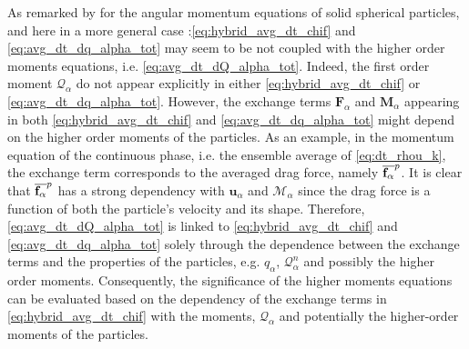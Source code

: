 As remarked by \citet{jackson1997locally} for the angular momentum equations of solid spherical particles, and here in a more general case :\ref{eq:hybrid_avg_dt_chif} and \ref{eq:avg_dt_dq_alpha_tot} may seem to be not coupled with the higher order moments equations, i.e. \ref{eq:avg_dt_dQ_alpha_tot}. 
Indeed, the first order moment $\mathcal{Q}_\alpha$ do not appear explicitly in either \ref{eq:hybrid_avg_dt_chif} or \ref{eq:avg_dt_dq_alpha_tot}.
However, the exchange terms 
$\textbf{F}_\alpha$ 
and 
$\textbf{M}_\alpha$ 
appearing in both \ref{eq:hybrid_avg_dt_chif} and \ref{eq:avg_dt_dq_alpha_tot} might depend on the higher order moments of the particles.
As an example, in the momentum equation of the continuous phase, i.e. the ensemble average of \ref{eq:dt_rhou_k}, the exchange term corresponds to the averaged drag force, namely $\overline{\textbf{f}_\alpha}^{p}$. 
It is clear that $\overline{\textbf{f}_\alpha}^{p}$ has a strong dependency with $\textbf{u}_\alpha$ and $\mathcal{M}_\alpha$ since the drag force is a function of both the particle's velocity and its shape. 
Therefore, \ref{eq:avg_dt_dQ_alpha_tot} is linked to \ref{eq:hybrid_avg_dt_chif} and \ref{eq:avg_dt_dq_alpha_tot} solely through the dependence between the exchange terms and the properties of the particles, e.g. $q_\alpha$, $\mathcal{Q}^n_\alpha$ and possibly the higher order moments. 
Consequently, the significance of the higher moments equations can be evaluated based on the dependency of the exchange terms in \ref{eq:hybrid_avg_dt_chif} with the moments,  $\mathcal{Q}_\alpha$ and potentially the higher-order moments of the particles. 
